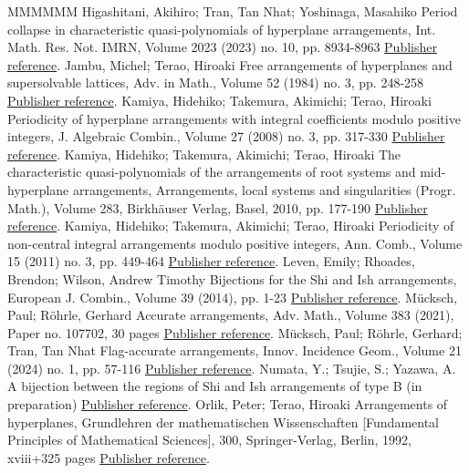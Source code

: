\begin{thebibliography}{MMMMMM}
 Higashitani, Akihiro; Tran, Tan Nhat; Yoshinaga, Masahiko Period collapse in characteristic quasi-polynomials of hyperplane arrangements, Int. Math. Res. Not. IMRN, Volume 2023 (2023) no. 10, pp. 8934-8963 \href{https://alco.centre-mersenne.org/articles/10.5802/alco.405/#HTY23}{Publisher reference}.
 Jambu, Michel; Terao, Hiroaki Free arrangements of hyperplanes and supersolvable lattices, Adv. in Math., Volume 52 (1984) no. 3, pp. 248-258 \href{https://alco.centre-mersenne.org/articles/10.5802/alco.405/#JT84}{Publisher reference}.
 Kamiya, Hidehiko; Takemura, Akimichi; Terao, Hiroaki Periodicity of hyperplane arrangements with integral coefficients modulo positive integers, J. Algebraic Combin., Volume 27 (2008) no. 3, pp. 317-330 \href{https://alco.centre-mersenne.org/articles/10.5802/alco.405/#KTT08}{Publisher reference}.
 Kamiya, Hidehiko; Takemura, Akimichi; Terao, Hiroaki The characteristic quasi-polynomials of the arrangements of root systems and mid-hyperplane arrangements, Arrangements, local systems and singularities (Progr. Math.), Volume 283, Birkhäuser Verlag, Basel, 2010, pp. 177-190 \href{https://alco.centre-mersenne.org/articles/10.5802/alco.405/#KTT10}{Publisher reference}.
 Kamiya, Hidehiko; Takemura, Akimichi; Terao, Hiroaki Periodicity of non-central integral arrangements modulo positive integers, Ann. Comb., Volume 15 (2011) no. 3, pp. 449-464 \href{https://alco.centre-mersenne.org/articles/10.5802/alco.405/#KTT11}{Publisher reference}.
 Leven, Emily; Rhoades, Brendon; Wilson, Andrew Timothy Bijections for the Shi and Ish arrangements, European J. Combin., Volume 39 (2014), pp. 1-23 \href{https://alco.centre-mersenne.org/articles/10.5802/alco.405/#LRW14}{Publisher reference}.
 Mücksch, Paul; Röhrle, Gerhard Accurate arrangements, Adv. Math., Volume 383 (2021), Paper no. 107702, 30 pages \href{https://alco.centre-mersenne.org/articles/10.5802/alco.405/#MR21}{Publisher reference}.
 Mücksch, Paul; Röhrle, Gerhard; Tran, Tan Nhat Flag-accurate arrangements, Innov. Incidence Geom., Volume 21 (2024) no. 1, pp. 57-116 \href{https://alco.centre-mersenne.org/articles/10.5802/alco.405/#MRT24}{Publisher reference}.
 Numata, Y.; Tsujie, S.; Yazawa, A. A bijection between the regions of Shi and Ish arrangements of type B (in preparation) \href{https://alco.centre-mersenne.org/articles/10.5802/alco.405/#NTY}{Publisher reference}.
 Orlik, Peter; Terao, Hiroaki Arrangements of hyperplanes, Grundlehren der mathematischen Wissenschaften [Fundamental Principles of Mathematical Sciences], 300, Springer-Verlag, Berlin, 1992, xviii+325 pages \href{https://alco.centre-mersenne.org/articles/10.5802/alco.405/#OT92}{Publisher reference}.

\end{thebibliography}
